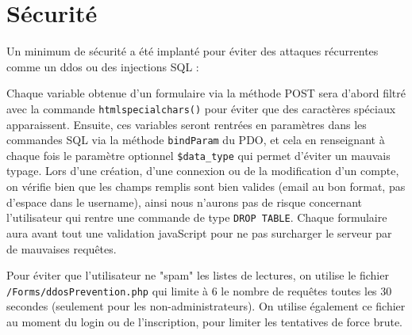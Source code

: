 \section{Sécurité}
    Un minimum de sécurité a été implanté pour éviter des attaques récurrentes comme un ddos ou des injections SQL :

Chaque variable obtenue d'un formulaire via la méthode POST sera d'abord filtré avec la commande \texttt{htmlspecialchars()} pour éviter que des caractères spéciaux apparaissent. Ensuite, ces variables seront rentrées en paramètres dans les commandes SQL via la méthode \texttt{bindParam} du PDO, et cela en renseignant à chaque fois le paramètre optionnel \texttt{\$data\_type} qui permet d'éviter un mauvais typage.\newline
Lors d'une création, d'une connexion ou de la modification d'un compte, on vérifie bien que les champs remplis sont bien valides (email au bon format, pas d'espace dans le username), ainsi nous n'aurons pas de risque concernant l'utilisateur qui rentre une commande de type \texttt{DROP TABLE}.
Chaque formulaire aura avant tout une validation javaScript pour ne pas surcharger le serveur par de mauvaises requêtes.\newline


Pour éviter que l'utilisateur ne "spam" les listes de lectures, on utilise le fichier \texttt{/Forms/ddosPrevention.php} qui limite à 6 le nombre de requêtes toutes les 30 secondes (seulement pour les non-administrateurs).
On utilise également ce fichier au moment du login ou de l'inscription, pour limiter les tentatives de force brute.

